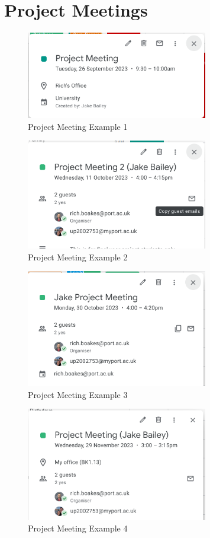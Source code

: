 \chapter{Project Meetings}
\begin{figure}[ht!]
    \centering
    \includegraphics[width=300px]{figures/project-meeting-1.png}
    \caption{Project Meeting Example 1}
    \label{fig:meeting-1}
\end{figure}

\begin{figure}[ht!]
    \centering
    \includegraphics[width=300px]{figures/project-meeting-2.png}
    \caption{Project Meeting Example 2}
    \label{fig:meeting-2}
\end{figure}

\begin{figure}[ht!]
    \centering
    \includegraphics[width=300px]{figures/project-meeting-3.png}
    \caption{Project Meeting Example 3}
    \label{fig:meeting-3}
\end{figure}

\begin{figure}[ht!]
    \centering
    \includegraphics[width=300px]{figures/project-meeting-4.png}
    \caption{Project Meeting Example 4}
    \label{fig:meeting-4}
\end{figure}